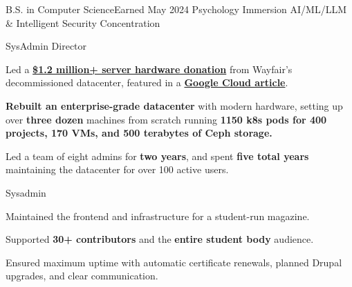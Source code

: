 \vspace{1.5pt} %

{B.S. in Computer Science}{Earned May 2024}
{Psychology Immersion}
{AI/ML/LLM \& Intelligent Security Concentration}

\cvtag{\LaTeX}

\smallskip


{
  {SysAdmin Director}    \hfill{}\newline
}
{
  \item{Led a \href{https://www.rit.edu/news/wayfair-gifts-850000-servers-rits-computer-science-house}{\textbf{\$1.2 million+ server hardware donation}} from Wayfair's decommissioned datacenter,} featured in a \href{https://cloud.google.com/blog/transform/wayfair-server-donation-mass-open-cloud-rit-student-innovation-johonnot}{\textbf{Google Cloud article}}.
  \item{\textbf{Rebuilt an enterprise-grade datacenter} with modern hardware, setting up over \textbf{three dozen} machines from scratch running \textbf{1150 k8s pods for 400 projects, 170 VMs, and 500 terabytes of Ceph storage.}}
  \item{Led a team of eight admins for \textbf{two years}, and spent \textbf{five total years} maintaining the datacenter for over 100 active users.}
}

{
  {Sysadmin} \hfill{}\newline
}
{
  \item{Maintained the frontend and infrastructure for a student-run magazine.}
  \item{Supported \textbf{30+ contributors} and the \textbf{entire student body} audience.}
  \item{Ensured maximum uptime with automatic certificate renewals, planned Drupal upgrades, and clear communication.}
}

